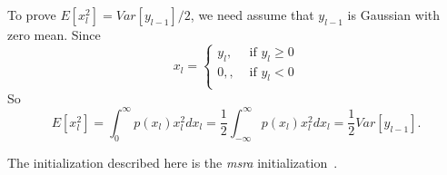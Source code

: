 To prove $E[x_l^2]=Var[y_{l-1}]/2$,
we need assume that $y_{l-1}$ is Gaussian with zero mean.
Since
\begin{equation}
    x_l = \begin{cases}
        y_l, &\text{ if }y_l\ge0\\
        0, , &\text{ if }y_l<0\\
    \end{cases}
\end{equation}
So
\begin{equation}
    E[x_l^2] = \int_0^\infty p(x_l)x_l^2 dx_l
        = \frac{1}{2}\int_{-\infty}^\infty p(x_l)x_l^2 dx_l
        = \frac{1}{2}Var[y_{l-1}].
\end{equation}

The initialization described here is the \emph{msra} initialization~\cite{he2015delving}.

\subsection{} %

\subsection{} %
